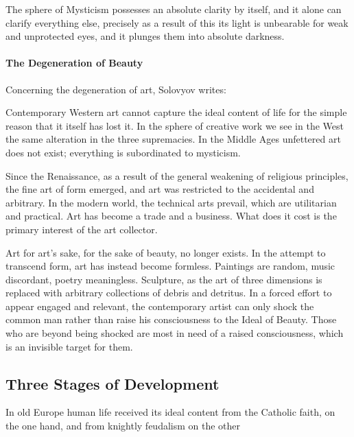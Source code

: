 \begin{quotex}
The sphere of Mysticism possesses an absolute clarity by itself, and it alone can clarify everything else, precisely as a result of this its light is unbearable for weak and unprotected eyes, and it plunges them into absolute darkness. 

\end{quotex}
\paragraph{The Degeneration of Beauty}
Concerning the degeneration of art, Solovyov writes:

\begin{quotex}
Contemporary Western art cannot capture the ideal content of life for the simple reason that it itself has lost it. In the sphere of creative work we see in the West the same alteration in the three supremacies. In the Middle Ages unfettered art does not exist; everything is subordinated to mysticism. 

\end{quotex}
Since the Renaissance, as a result of the general weakening of religious principles, the fine art of form emerged, and art was restricted to the accidental and arbitrary. In the modern world, the technical arts prevail, which are utilitarian and practical. Art has become a trade and a business. What does it cost is the primary interest of the art collector.

Art for art's sake, for the sake of beauty, no longer exists. In the attempt to transcend form, art has instead become formless. Paintings are random, music discordant, poetry meaningless. Sculpture, as the art of three dimensions is replaced with arbitrary collections of debris and detritus. In a forced effort to appear engaged and relevant, the contemporary artist can only shock the common man rather than raise his consciousness to the Ideal of Beauty. Those who are beyond being shocked are most in need of a raised consciousness, which is an invisible target for them.

\subsection{Three Stages of Development}

\begin{quotex}
In old Europe human life received its ideal content from the Catholic faith, on the one hand, and from knightly feudalism on the other 
\end{quotex}

